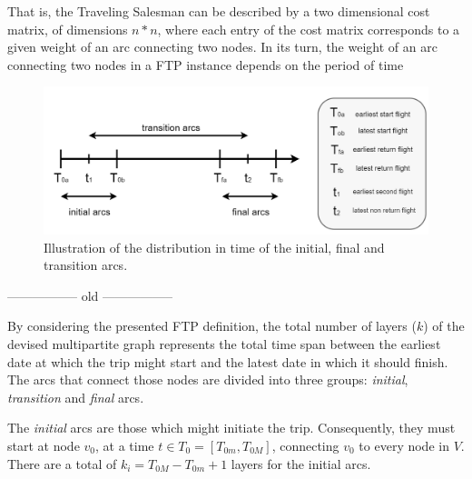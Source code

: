 That is, the Traveling Salesman can be described by a two dimensional cost matrix, of dimensions $n*n$, where each entry of the cost matrix corresponds to a given weight of an arc connecting two nodes. In its turn, the weight of an arc connecting two nodes in a FTP instance depends on the period of time 



\begin{figure}[htpb]
  \centering
  \includegraphics[width=\textwidth]{./Figures/system_design/flights_times.png}
  \caption{Illustration of the distribution in time of the initial, final and transition arcs.}
  \label{fig:multipartite_times} 
\end{figure}





















----------------- old -----------------

By considering the presented FTP definition, the total number of layers ($k$) of
the devised multipartite graph represents the total time span between the
earliest date at which the trip might start and the latest date in which it
should finish. The arcs that connect those nodes are divided into three groups:
\textit{initial}, \textit{transition} and \textit{final} arcs.

The \textit{initial} arcs are those which might initiate the trip. Consequently,
they must start at node $v_0$, at a time $t \in T_0 = [T_{0m}, T_{0M}]$,
connecting $v_0$ to every node in $V$. There are a total of $k_i = T_{0M} -
T_{0m} + 1$ layers for the initial arcs.

